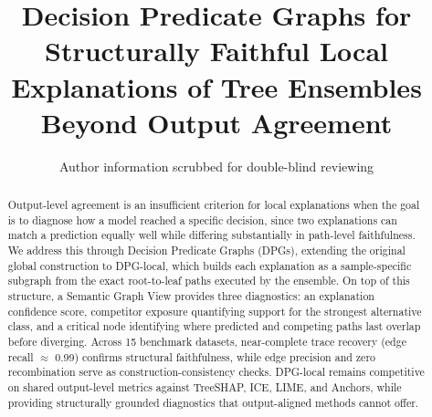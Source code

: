 \documentclass[runningheads]{llncs}
\begin{document}
\title{Decision Predicate Graphs for Structurally Faithful Local Explanations of Tree Ensembles Beyond Output Agreement}



\author{Author information scrubbed for double-blind reviewing}
\institute{}

\maketitle
\begin{abstract} %
Output-level agreement is an insufficient criterion for local explanations when the goal is to diagnose how a model reached a specific decision, since two explanations can match a prediction equally well while differing substantially in path-level faithfulness. We address this through Decision Predicate Graphs (DPGs), extending the original global construction to DPG-local, which builds each explanation as a sample-specific subgraph from the exact root-to-leaf paths executed by the ensemble. On top of this structure, a Semantic Graph View provides three diagnostics: an explanation confidence score, competitor exposure quantifying support for the strongest alternative class, and a critical node identifying where predicted and competing paths last overlap before diverging. Across 15 benchmark datasets, near-complete trace recovery (edge recall $\approx$ 0.99) confirms structural faithfulness, while edge precision and zero recombination serve as construction-consistency checks. DPG-local remains competitive on shared output-level metrics against TreeSHAP, ICE, LIME, and Anchors, while providing structurally grounded diagnostics that output-aligned methods cannot offer.
\end{abstract}
\end{document}
